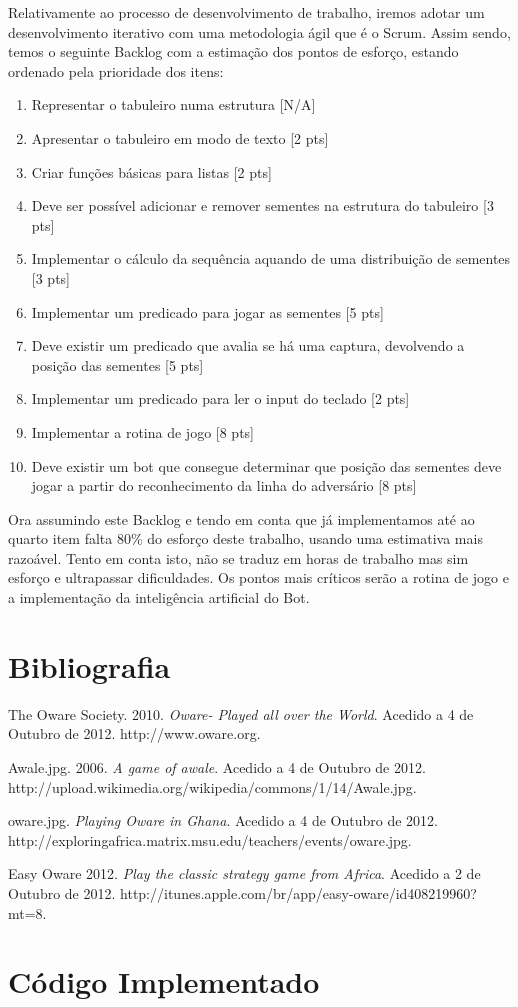 \documentclass[15pt,a4paper]{article}
\begin{document}
\indent Relativamente ao processo de desenvolvimento de trabalho, iremos adotar um desenvolvimento iterativo com uma metodologia ágil que é o Scrum. Assim sendo, temos o seguinte Backlog com a estimação dos pontos de esforço, estando ordenado pela prioridade dos itens:

\begin{enumerate}
  \item Representar o tabuleiro numa estrutura [N/A]
  \item Apresentar o tabuleiro em modo de texto [2 pts]
  \item Criar funções básicas para listas [2 pts]
  \item Deve ser possível adicionar e remover sementes na estrutura do tabuleiro [3 pts]
  \item Implementar o cálculo da sequência aquando de uma distribuição de sementes [3 pts]
  \item Implementar um predicado para jogar as sementes [5 pts]
  \item Deve existir um predicado que avalia se há uma captura, devolvendo a posição das sementes [5 pts]
  \item Implementar um predicado para ler o input do teclado [2 pts]
  \item Implementar a rotina de jogo [8 pts]
  \item Deve existir um bot que consegue determinar que posição das sementes deve jogar a partir do reconhecimento da linha do adversário [8 pts]
\end{enumerate}

Ora assumindo este Backlog e tendo em conta que já implementamos até ao quarto item falta 80\% do esforço deste trabalho, usando uma estimativa mais razoável. Tento em conta isto, não se traduz em horas de trabalho mas sim esforço e ultrapassar dificuldades. Os pontos mais críticos serão a rotina de jogo e a implementação da inteligência artificial do Bot.
\newpage
\section{Bibliografia}
\begin{thebibliography}{9}

  The Oware Society.
  2010.
  \emph{ Oware- Played all over the World}.
  Acedido a 4 de Outubro de 2012.
  http://www.oware.org.
  
  Awale.jpg.
  2006.
  \emph{A game of awale}.
  Acedido a 4 de Outubro de 2012.
  http://upload.wikimedia.org/wikipedia/commons/1/14/Awale.jpg.
  
	oware.jpg.
  \emph{Playing Oware in Ghana}.
  Acedido a 4 de Outubro de 2012.
  http://exploringafrica.matrix.msu.edu/teachers/events/oware.jpg.
  
	Easy Oware
	2012.
  \emph{Play the classic strategy game from Africa}.
  Acedido a 2 de Outubro de 2012.
  http://itunes.apple.com/br/app/easy-oware/id408219960?mt=8.

\end{thebibliography}

\newpage
\appendix
\section{Código Implementado}
 \begin{verbatim}
\end{verbatim}
\end{document}
